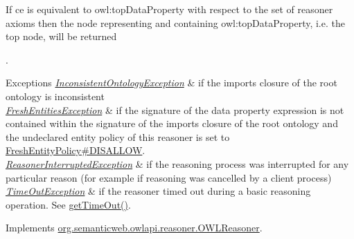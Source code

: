 If {\ttfamily ce} is equivalent to {\ttfamily owl\-:top\-Data\-Property} with respect to the set of reasoner axioms then the node representing and containing {\ttfamily owl\-:top\-Data\-Property}, i.\-e. the top node, will be returned 

.


\begin{DoxyExceptions}{Exceptions}
{\em \hyperlink{classorg_1_1semanticweb_1_1owlapi_1_1reasoner_1_1_inconsistent_ontology_exception}{Inconsistent\-Ontology\-Exception}} & if the imports closure of the root ontology is inconsistent \\
\hline
{\em \hyperlink{classorg_1_1semanticweb_1_1owlapi_1_1reasoner_1_1_fresh_entities_exception}{Fresh\-Entities\-Exception}} & if the signature of the data property expression is not contained within the signature of the imports closure of the root ontology and the undeclared entity policy of this reasoner is set to \hyperlink{enumorg_1_1semanticweb_1_1owlapi_1_1reasoner_1_1_fresh_entity_policy_a762eae6d5b2449d125311ecaabfdc8d0}{Fresh\-Entity\-Policy\#\-D\-I\-S\-A\-L\-L\-O\-W}. \\
\hline
{\em \hyperlink{classorg_1_1semanticweb_1_1owlapi_1_1reasoner_1_1_reasoner_interrupted_exception}{Reasoner\-Interrupted\-Exception}} & if the reasoning process was interrupted for any particular reason (for example if reasoning was cancelled by a client process) \\
\hline
{\em \hyperlink{classorg_1_1semanticweb_1_1owlapi_1_1reasoner_1_1_time_out_exception}{Time\-Out\-Exception}} & if the reasoner timed out during a basic reasoning operation. See \hyperlink{classorg_1_1semanticweb_1_1owlapi_1_1reasoner_1_1impl_1_1_o_w_l_reasoner_base_af55342eaaabb1b72dacfde7a181b93d2}{get\-Time\-Out()}. \\
\hline
\end{DoxyExceptions}


Implements \hyperlink{interfaceorg_1_1semanticweb_1_1owlapi_1_1reasoner_1_1_o_w_l_reasoner_a601c0ca24b4aeb85aadc29e57341779e}{org.\-semanticweb.\-owlapi.\-reasoner.\-O\-W\-L\-Reasoner}.

